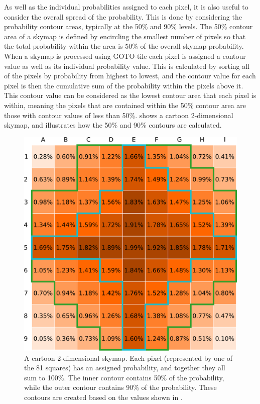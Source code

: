 \begin{colsection}
As well as the individual probabilities assigned to each pixel, it is also useful to consider the overall spread of the probability. This is done by considering the probability contour areas, typically at the 50\% and 90\% levels. The 50\% contour area of a skymap is defined by encircling the smallest number of pixels so that the total probability within the area is 50\% of the overall skymap probability. When a skymap is processed using GOTO-tile each pixel is assigned a contour value as well as its individual probability value. This is calculated by sorting all of the pixels by probability from highest to lowest, and the contour value for each pixel is then the cumulative sum of the probability within the pixels above it. This contour value can be considered as the lowest contour area that each pixel is within, meaning the pixels that are contained within the 50\% contour area are those with contour values of less than 50\%.  shows a cartoon 2-dimensional skymap, and  illustrates how the 50\% and 90\% contours are calculated.

\makeatletter
\setlength{\@fptop}{1cm}
\makeatother

\begin{figure}[t]
    \begin{center}
        \includegraphics[width=0.95\linewidth]{images/sim/sim_skymap_probs.pdf}
    \end{center}
    \caption[An example 2D probability skymap]{
        A cartoon 2-dimensional skymap. Each pixel (represented by one of the 81 squares) has an assigned probability, and together they all sum to 100\%. The  inner contour contains 50\% of the probability, while the  outer contour contains 90\% of the probability. These contours are created based on the values shown in .
    }\label{fig:sim_skymap_probs}
\end{figure}


\end{colsection}
